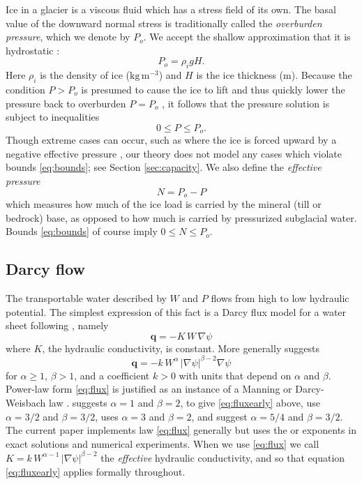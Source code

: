 \documentclass[gmd]{copernicus}   %
\newcommand{\text}{\textrm}
\newcommand\bq{\mathbf{q}}
\newcommand{\grad}{\nabla}
\begin{document}
Ice in a glacier is a viscous fluid which has a stress field of its own.  The basal value of the downward normal stress is traditionally called the \emph{overburden pressure}, which we denote by $P_o$.  We accept the shallow approximation that it is hydrostatic \citep{GreveBlatter2009}:
\begin{equation} \label{eq:hydrostatic}
  P_o = \rho_i g H.
\end{equation}
Here $\rho_i$ is the density of ice ($\text{kg}\,\text{m}^{-3}$) and $H$ is the ice thickness (m).  Because the condition $P>P_o$ is presumed to cause the ice to lift and thus quickly lower the pressure back to overburden $P=P_o$ \citep{Schoofetal2012}, it follows that the pressure solution is subject to inequalities
\begin{equation}
0 \le P \le P_o. \label{eq:bounds}
\end{equation}
Though extreme cases can occur, such as where the ice is forced upward by a negative effective pressure \citep{Schoofetal2012}, our theory does not model any cases which  violate bounds \eqref{eq:bounds}; see Section \ref{sec:capacity}.  We also define the \emph{effective pressure}
\begin{equation}
N = P_o - P  \label{eq:effective}
\end{equation}
which measures how much of the ice load is carried by the mineral (till or bedrock) base, as opposed to how much is carried by pressurized subglacial water.  Bounds \eqref{eq:bounds} of course imply $0 \le N \le P_o$.

\subsection{Darcy flow}  The transportable water described by $W$ and $P$ flows from high to low hydraulic potential.  The simplest expression of this fact is a Darcy flux model for a water sheet following \cite{Clarke05}, namely
\begin{equation}  \label{eq:fluxearly}
\bq = - K \,W\, \grad \psi
\end{equation}
where $K$, the hydraulic conductivity, is constant.  More generally \cite{Schoofetal2012} suggests
\begin{equation}  \label{eq:flux}
\bq = - k\, W^\alpha\, |\grad \psi|^{\beta-2} \grad \psi
\end{equation}
for $\alpha \ge 1$, $\beta>1$, and a coefficient $k>0$ with units that depend on $\alpha$ and $\beta$.  Power-law form \eqref{eq:flux} is justified as an instance of a Manning or Darcy-Weisbach law \citep{Schoofetal2012}.  \cite{Clarke05} suggests $\alpha=1$ and $\beta=2$, to give \eqref{eq:fluxearly} above, \cite{CreytsSchoof2009} use $\alpha=3/2$ and $\beta=3/2$, \cite{Hewitt2011,Hewitt2013} uses $\alpha=3$ and $\beta = 2$, and \cite{Hewittetal2012} suggest $\alpha=5/4$ and $\beta=3/2$.  The current paper implements law \eqref{eq:flux} generally but uses the \cite{Clarke05} or \cite{Hewittetal2012} exponents in exact solutions and numerical experiments.  When we use \eqref{eq:flux} we call $K = k\, W^{\alpha-1}\, |\grad \psi|^{\beta-2}$ the \emph{effective} hydraulic conductivity, and so that equation \eqref{eq:fluxearly} applies formally throughout.
\end{document}
